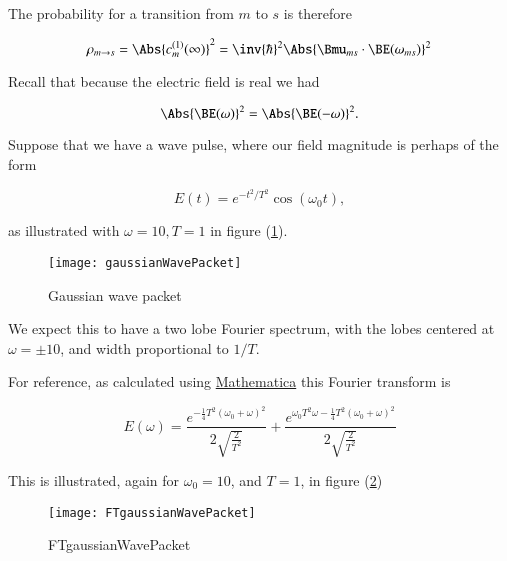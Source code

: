 The probability for a transition from $m$ to $s$ is therefore

\begin{equation}\label{eqn:qmTwoL8:70}
\rho_{m \rightarrow s} = \Abs{ c_m^{(1)}(\infty) }^2
= \inv{\hbar}^2 \Abs{\Bmu_{ms} \cdot \BE(\omega_{ms})}^2
\end{equation}

Recall that because the electric field is real we had

\begin{equation}\label{eqn:qmTwoL8:90}
\Abs{\BE(\omega)}^2 = \Abs{\BE(-\omega)}^2.
\end{equation}

Suppose that we have a wave pulse, where our field magnitude is perhaps of the form

\begin{equation}\label{eqn:qmTwoL8:110}
E(t) = e^{-t^2/T^2} \cos(\omega_0 t),
\end{equation}

as illustrated with $\omega = 10, T = 1$ in figure (\ref{fig:gaussianWavePacket}).

\begin{figure}[htp]
\centering
\texttt{[image: gaussianWavePacket]}
\caption{Gaussian wave packet}\label{fig:gaussianWavePacket}
\end{figure}

We expect this to have a two lobe Fourier spectrum, with the lobes centered at $\omega = \pm 10$, and width proportional to $1/T$.

For reference, as calculated using \href{https://github.com/peeterjoot/physicsplay/tree/master/notes/phy456/qmTwoL8figures.nb}{Mathematica} this Fourier transform is

\begin{equation}\label{eqn:qmTwoL8:130}
E(\omega) = \frac{e^{-\frac{1}{4} T^2 (\omega_0+\omega )^2}}{2 \sqrt{\frac{2}{T^2}}}+\frac{e^{\omega_0 T^2 \omega -\frac{1}{4} T^2 (\omega_0+\omega )^2}}{2 \sqrt{\frac{2}{T^2}}}
\end{equation}

This is illustrated, again for $\omega_0 = 10$, and $T=1$, in figure (\ref{fig:FTgaussianWavePacket})

\begin{figure}[htp]
\centering
\texttt{[image: FTgaussianWavePacket]}
\caption{FTgaussianWavePacket}\label{fig:FTgaussianWavePacket}
\end{figure}


